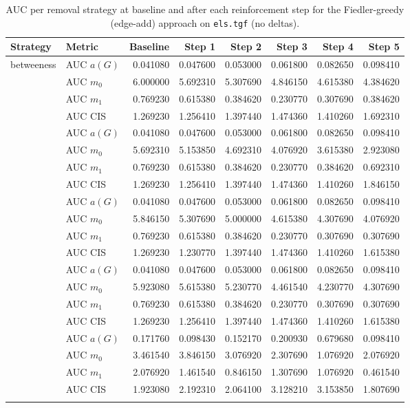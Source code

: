 \begin{table}[htbp]
  \centering
  \caption{AUC per removal strategy at baseline and after each reinforcement step for the Fiedler-greedy (edge-add) approach on \texttt{els.tgf} (no deltas).}
  \label{tab:els-fiedler_greedy-auc}
  \begin{tabular}{llrrrrrr}
    \toprule
    \textbf{Strategy} & \textbf{Metric} & \textbf{Baseline} & \textbf{Step 1} & \textbf{Step 2} & \textbf{Step 3} & \textbf{Step 4} & \textbf{Step 5} \\
    \midrule
    \multirow{4}{*}{betweeness} & AUC $a(G)$ & 0.041080 & 0.047600 & 0.053000 & 0.061800 & 0.082650 & 0.098410 \\
    & AUC $m_0$ & 6.000000 & 5.692310 & 5.307690 & 4.846150 & 4.615380 & 4.384620 \\
    & AUC $m_1$ & 0.769230 & 0.615380 & 0.384620 & 0.230770 & 0.307690 & 0.384620 \\
    & AUC CIS & 1.269230 & 1.256410 & 1.397440 & 1.474360 & 1.410260 & 1.692310 \\
    \addlinespace
    \multirow{4}{*}{closeness} & AUC $a(G)$ & 0.041080 & 0.047600 & 0.053000 & 0.061800 & 0.082650 & 0.098410 \\
    & AUC $m_0$ & 5.692310 & 5.153850 & 4.692310 & 4.076920 & 3.615380 & 2.923080 \\
    & AUC $m_1$ & 0.769230 & 0.615380 & 0.384620 & 0.230770 & 0.384620 & 0.692310 \\
    & AUC CIS & 1.269230 & 1.256410 & 1.397440 & 1.474360 & 1.410260 & 1.846150 \\
    \addlinespace
    \multirow{4}{*}{core influence} & AUC $a(G)$ & 0.041080 & 0.047600 & 0.053000 & 0.061800 & 0.082650 & 0.098410 \\
    & AUC $m_0$ & 5.846150 & 5.307690 & 5.000000 & 4.615380 & 4.307690 & 4.076920 \\
    & AUC $m_1$ & 0.769230 & 0.615380 & 0.384620 & 0.230770 & 0.307690 & 0.307690 \\
    & AUC CIS & 1.269230 & 1.230770 & 1.397440 & 1.474360 & 1.410260 & 1.615380 \\
    \addlinespace
    \multirow{4}{*}{degree} & AUC $a(G)$ & 0.041080 & 0.047600 & 0.053000 & 0.061800 & 0.082650 & 0.098410 \\
    & AUC $m_0$ & 5.923080 & 5.615380 & 5.230770 & 4.461540 & 4.230770 & 4.307690 \\
    & AUC $m_1$ & 0.769230 & 0.615380 & 0.384620 & 0.230770 & 0.307690 & 0.307690 \\
    & AUC CIS & 1.269230 & 1.256410 & 1.397440 & 1.474360 & 1.410260 & 1.615380 \\
    \addlinespace
    \multirow{4}{*}{random} & AUC $a(G)$ & 0.171760 & 0.098430 & 0.152170 & 0.200930 & 0.679680 & 0.098410 \\
    & AUC $m_0$ & 3.461540 & 3.846150 & 3.076920 & 2.307690 & 1.076920 & 2.076920 \\
    & AUC $m_1$ & 2.076920 & 1.461540 & 0.846150 & 1.307690 & 1.076920 & 0.461540 \\
    & AUC CIS & 1.923080 & 2.192310 & 2.064100 & 3.128210 & 3.153850 & 1.807690 \\
    \addlinespace
    \bottomrule
  \end{tabular}
\end{table}
